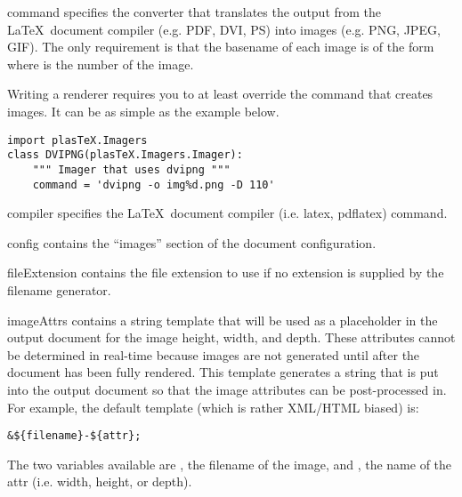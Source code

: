 \begin{memberdesc}[Imager]{command}
specifies the converter that translates the output from the \LaTeX\
document compiler (e.g. PDF, DVI, PS) into images (e.g. PNG, JPEG, GIF).
The only requirement is that the basename of each image is of the
form \file{img\%d} where \file{\%d} is the number of the image.


Writing a renderer requires you to at least override the command that
creates images.  It can be as simple as the example below.
\begin{verbatim}
import plasTeX.Imagers
class DVIPNG(plasTeX.Imagers.Imager):
    """ Imager that uses dvipng """
    command = 'dvipng -o img%d.png -D 110'
\end{verbatim}
\end{memberdesc}

\begin{memberdesc}[Imager]{compiler}
specifies the \LaTeX\ document compiler (i.e. latex, pdflatex) command.

\end{memberdesc}

\begin{memberdesc}[Imager]{config}
contains the ``images'' section of the document configuration.
\end{memberdesc}

\begin{memberdesc}[Imager]{fileExtension}
contains the file extension to use if no extension is supplied by the
filename generator.
\end{memberdesc}

\begin{memberdesc}[Imager]{imageAttrs}
contains a string template that will be used as a placeholder in the output
document for the image height, width, and depth.  These attributes cannot
be determined in real-time because images are not generated until after
the document has been fully rendered.  This template generates a string
that is put into the output document so that the image attributes can 
be post-processed in.  For example, the default template (which is rather
XML/HTML biased) is:
\begin{verbatim}
&${filename}-${attr};
\end{verbatim}
The two variables available are , the filename of the 
image, and \var{attr}, the name of the attr (i.e. width, height, or depth).
\end{memberdesc}

